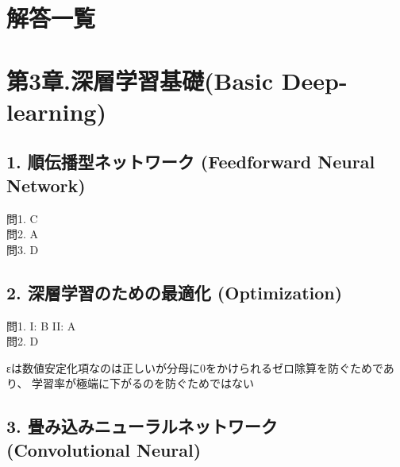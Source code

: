 \documentclass[
  letterpaper,
  DIV=11,
  numbers=noendperiod]{scrreprt}
\begin{document}

\chapter{解答一覧}\label{ux89e3ux7b54ux4e00ux89a7}


\chapter{第3章.深層学習基礎(Basic
Deep-learning)}\label{ux7b2c3ux7ae0.ux6df1ux5c64ux5b66ux7fd2ux57faux790ebasic-deep-learning}

\section{1. 順伝播型ネットワーク (Feedforward Neural
Network)}\label{ux9806ux4f1dux64adux578bux30cdux30c3ux30c8ux30efux30fcux30af-feedforward-neural-network-1}

問1. C\\
問2. A\\
問3. D

\section{2. 深層学習のための最適化
(Optimization)}\label{ux6df1ux5c64ux5b66ux7fd2ux306eux305fux3081ux306eux6700ux9069ux5316-optimization-1}

問1. I: B II: A\\
問2. D

\begin{tcolorbox}[enhanced jigsaw, opacitybacktitle=0.6, bottomtitle=1mm, colback=white, rightrule=.15mm, toptitle=1mm, bottomrule=.15mm, coltitle=black, leftrule=.75mm, opacityback=0, titlerule=0mm, colframe=quarto-callout-note-color-frame, arc=.35mm, breakable, toprule=.15mm, title=\textcolor{quarto-callout-note-color}{\faInfo}\hspace{0.5em}{解説}, left=2mm, colbacktitle=quarto-callout-note-color!10!white]

εは数値安定化項なのは正しいが分母に0をかけられるゼロ除算を防ぐためであり、
学習率が極端に下がるのを防ぐためではない

\end{tcolorbox}

\section{3. 畳み込みニューラルネットワーク (Convolutional
Neural)}\label{ux7573ux307fux8fbcux307fux30cbux30e5ux30fcux30e9ux30ebux30cdux30c3ux30c8ux30efux30fcux30af-convolutional-neural-1}
\end{document}
